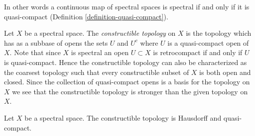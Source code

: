 \noindent
In other words a continuous map of spectral spaces is spectral if and
only if it is quasi-compact (Definition \ref{definition-quasi-compact}).

\medskip\noindent
Let $X$ be a spectral space. The {\it constructible topology} on $X$
is the topology which has as a subbase of opens the sets $U$ and $U^c$
where $U$ is a quasi-compact open of $X$. Note that since $X$ is spectral
an open $U \subset X$ is retrocompact if and only if $U$ is quasi-compact.
Hence the constructible topology can also be characterized as the coarsest
topology such that every constructible subset of $X$ is both open and closed.
Since the collection of quasi-compact opens is a basis for the topology
on $X$ we see that the constructible topology is stronger than the
given topology on $X$.

\begin{lemma}
\label{lemma-constructible-hausdorff-quasi-compact}
Let $X$ be a spectral space. The constructible topology is
Hausdorff and quasi-compact.
\end{lemma}

